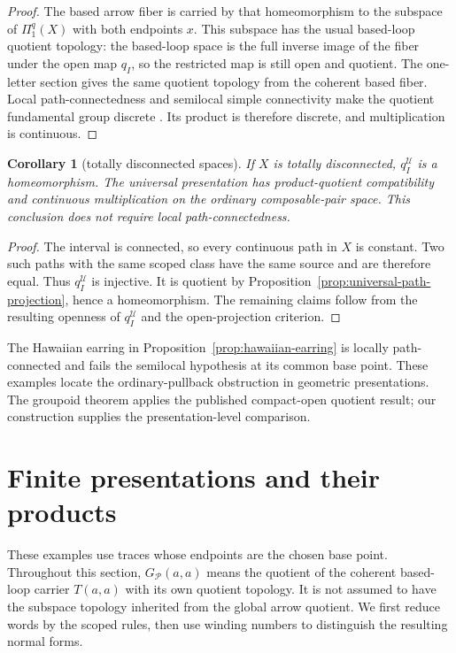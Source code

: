 \documentclass[10pt,reqno]{amsart}
\theoremstyle{definition}
\theoremstyle{plain}
\newtheorem{corollary}[definition]{Corollary}
\theoremstyle{remark}
\begin{document}
\begin{proof}
The based arrow fiber is carried by that homeomorphism to the subspace of
$\Pi_1^q(X)$ with both endpoints $x$.  This subspace has the usual
based-loop quotient topology: the based-loop space is the full inverse
image of the fiber under the open map $q_I$, so the restricted map is still
open and quotient.  The one-letter section gives the same quotient topology
from the coherent based fiber.  Local path-connectedness and semilocal
simple connectivity make the quotient fundamental group discrete
\cite[Corollary~3.10(iii)]{HolkarHossainKulkarni24}.  Its product is
therefore discrete, and multiplication is continuous.
\end{proof}

\begin{corollary}[totally disconnected spaces]
\label{cor:totally-disconnected-universal}
If $X$ is totally disconnected, $q_I^{\mathcal U}$ is a homeomorphism.
The universal presentation has product-quotient compatibility and
continuous multiplication on the ordinary composable-pair space.
This conclusion does not require local path-connectedness.
\end{corollary}

\begin{proof}
The interval is connected, so every continuous path in $X$ is constant.
Two such paths with the same scoped class have the same source and are
therefore equal. Thus $q_I^{\mathcal U}$ is injective. It is quotient by
Proposition~\ref{prop:universal-path-projection}, hence a homeomorphism.
The remaining claims follow from the resulting openness of
$q_I^{\mathcal U}$ and the open-projection criterion.
\end{proof}

The Hawaiian earring in Proposition~\ref{prop:hawaiian-earring} is locally
path-connected and fails the semilocal hypothesis at its common base point.
These examples locate the ordinary-pullback obstruction in geometric
presentations. The groupoid theorem applies the published compact-open quotient
result; our construction supplies the presentation-level comparison.

\section{Finite presentations and their products}
\label{sec:circle-torus}

These examples use traces whose endpoints are the chosen base point.
Throughout this section, $G_{\mathcal P}(a,a)$ means the quotient of the
coherent based-loop carrier $T(a,a)$ with its own quotient topology.
It is not assumed to have the subspace topology inherited from the global
arrow quotient.  We first reduce words by the scoped rules, then use
winding numbers to distinguish the resulting normal forms.
\end{document}

